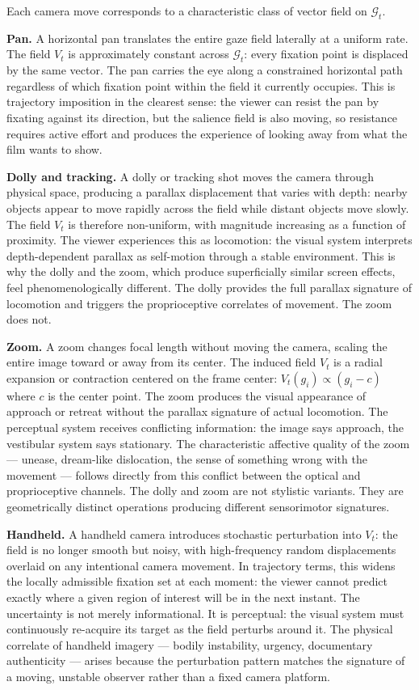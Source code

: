 \documentclass[12pt, a4paper]{article}
\theoremstyle{plain}
\theoremstyle{definition}
\theoremstyle{remark}
\newcommand{\G}{\mathcal{G}}
\begin{document}
Each camera move corresponds to a characteristic class of
vector field on $\G_t$.

\medskip
\noindent\textbf{Pan.} A horizontal pan translates the
entire gaze field laterally at a uniform rate. The field
$V_t$ is approximately constant across $\G_t$: every
fixation point is displaced by the same vector. The pan
carries the eye along a constrained horizontal path
regardless of which fixation point within the field it
currently occupies. This is trajectory imposition in the
clearest sense: the viewer can resist the pan by fixating
against its direction, but the salience field is also
moving, so resistance requires active effort and produces
the experience of looking away from what the film wants
to show.

\medskip
\noindent\textbf{Dolly and tracking.} A dolly or tracking
shot moves the camera through physical space, producing a
parallax displacement that varies with depth: nearby
objects appear to move rapidly across the field while
distant objects move slowly. The field $V_t$ is therefore
non-uniform, with magnitude increasing as a function of
proximity. The viewer experiences this as locomotion:
the visual system interprets depth-dependent parallax as
self-motion through a stable environment. This is why the
dolly and the zoom, which produce superficially similar
screen effects, feel phenomenologically different. The
dolly provides the full parallax signature of locomotion
and triggers the proprioceptive correlates of movement.
The zoom does not.

\medskip
\noindent\textbf{Zoom.} A zoom changes focal length without
moving the camera, scaling the entire image toward or away
from its center. The induced field $V_t$ is a radial
expansion or contraction centered on the frame center:
$V_t(g_i) \propto (g_i - c)$ where $c$ is the center
point. The zoom produces the visual appearance of approach
or retreat without the parallax signature of actual
locomotion. The perceptual system receives conflicting
information: the image says approach, the vestibular system
says stationary. The characteristic affective quality of
the zoom --- unease, dream-like dislocation, the sense of
something wrong with the movement --- follows directly from
this conflict between the optical and proprioceptive
channels. The dolly and zoom are not stylistic variants.
They are geometrically distinct operations producing
different sensorimotor signatures.

\medskip
\noindent\textbf{Handheld.} A handheld camera introduces
stochastic perturbation into $V_t$: the field is no longer
smooth but noisy, with high-frequency random displacements
overlaid on any intentional camera movement. In trajectory
terms, this widens the locally admissible fixation set at
each moment: the viewer cannot predict exactly where a
given region of interest will be in the next instant. The
uncertainty is not merely informational. It is perceptual:
the visual system must continuously re-acquire its target
as the field perturbs around it. The physical correlate of
handheld imagery --- bodily instability, urgency,
documentary authenticity --- arises because the perturbation
pattern matches the signature of a moving, unstable
observer rather than a fixed camera platform.
\end{document}
